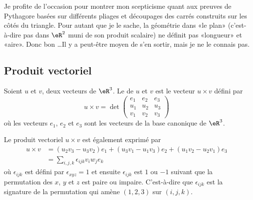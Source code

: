 Je profite de l'occasion pour montrer mon scepticisme quant aux preuves de Pythagore basées sur différents pliages et découpages des carrés construits sur les côtés du triangle. Pour autant que je le sache, la géométrie dans «le plan» (c'est-à-dire pas dans \( \eR^2\) muni de son produit scalaire) ne définit pas «longueur» et «aire». Donc bon \ldots Il y a peut-être moyen de s'en sortir, mais je ne le connais pas.

\subsection{Produit vectoriel}

\begin{definition}      \label{DEFooTNTNooRjhuJZ}
	Soient $u$ et $v$, deux vecteurs de $\eR^3$. Le  de $u$ et $v$ est le vecteur $u\times v$ défini par
    \begin{equation}        \label{EQooCUJRooFuFPaZ}
		u\times v=\det\begin{pmatrix}
			e_1	&	e_2	&	e_3	\\
			u_1	&	u_2	&	u_3	\\
			v_1	&	v_2	&	v_3
		\end{pmatrix}
    \end{equation}
	où les vecteurs $e_1$, $e_2$ et $e_3$ sont les vecteurs de la base canonique de $\eR^3$.
\end{definition}

\begin{lemma}
    Le produit vectoriel \( u\times v\) est également exprimé par
    \begin{subequations}        \label{EQSooOWGZooNYruoy}
        \begin{align}
            u\times v&=(u_2v_3-u_3v_2)e_1+(u_3v_1-u_1v_3)e_2+(u_1v_2-u_2v_1)e_3     \label{SEBEQooVROKooRpUOIr}\\
                &=\sum_{i,j,k}\epsilon_{ijk}v_iw_je_k
        \end{align}
    \end{subequations}
    où $\epsilon_{ijk}$ est défini par $\epsilon_{xyz}=1$ et ensuite $\epsilon_{ijk}$ est $1$ ou $-1$ suivant que la permutation des $x$, $y$ et $z$ est paire ou impaire. C'est-à-dire que \( \epsilon_{ijk}\) est la signature de la permutation qui amène \( (1,2,3)\) sur \( (i,j,k)\).
\end{lemma}

